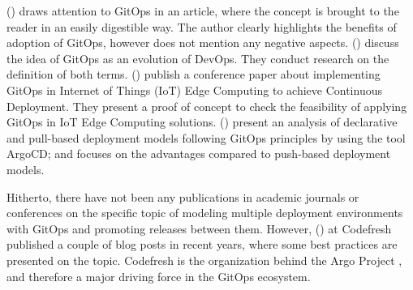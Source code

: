 \noindent
\citeauthor{limoncelli_gitopsPathToMoreSelfService} (\citeyear{limoncelli_gitopsPathToMoreSelfService})
draws attention to GitOps in an article, where the concept is brought to the reader in an easily digestible way.
The author clearly highlights the benefits of adoption of GitOps,
however does not mention any negative aspects.
\citeauthor{gitopsTheEvolutionOfDevops9565152} (\citeyear{gitopsTheEvolutionOfDevops9565152})
discuss the idea of GitOps as an evolution of DevOps. They conduct research on the definition of both terms.
\citeauthor{continuousDeploymentIOTEdgeComputingAGitOpsImplementation_9820108} (\citeyear{continuousDeploymentIOTEdgeComputingAGitOpsImplementation_9820108})
publish a conference paper about implementing GitOps in Internet of Things (IoT) Edge Computing
to achieve Continuous Deployment.
They present a proof of concept to check the feasibility of applying GitOps
in IoT Edge Computing solutions.
\citeauthor{analysisOnDeclarativePullBasedDeploymentGitOpsArgoCD_9563984} (\citeyear{analysisOnDeclarativePullBasedDeploymentGitOpsArgoCD_9563984})
present an analysis of declarative and pull-based deployment models
following GitOps principles by using the tool ArgoCD;
and focuses on the advantages compared to push-based deployment models.
\bigskip

\noindent
Hitherto, there have not been any publications
in academic journals or conferences
on the specific topic of
modeling multiple deployment environments with GitOps and promoting releases between them.
However,
%
\citeauthor{kostisKapelonisMeetACodefresher} (\citeyear{kostisKapelonisMeetACodefresher})
at Codefresh
published a couple of blog posts in recent years,
where some best practices are presented on the topic.
Codefresh is the organization behind the Argo Project \autocite{argoProjWebsite},
and therefore a major driving force in the GitOps ecosystem.
\bigskip

